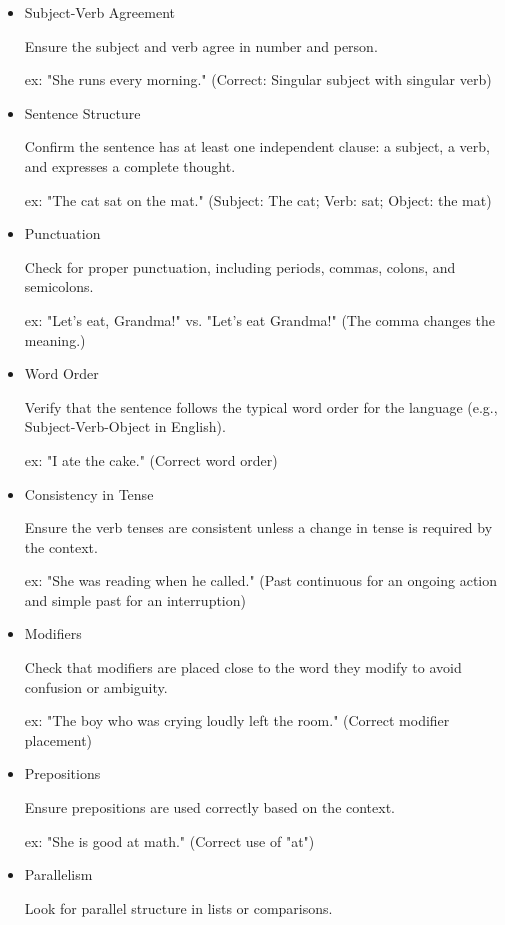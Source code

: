 \documentclass{book}
\begin{document}
\begin{itemize}
	\item Subject-Verb Agreement
	      
	      Ensure the subject and verb agree in number and person.
	      
	      ex: "She runs every morning." (Correct: Singular subject with singular verb)
	\item Sentence Structure
	      
	      Confirm the sentence has at least one independent clause: a subject, a verb, and expresses a complete thought.
	      
	      ex: "The cat sat on the mat." (Subject: The cat; Verb: sat; Object: the mat)
	\item Punctuation
	      
	      Check for proper punctuation, including periods, commas, colons, and semicolons.
	      
	      ex: "Let's eat, Grandma!" vs. "Let's eat Grandma!" (The comma changes the meaning.)
	\item Word Order
	      
	      Verify that the sentence follows the typical word order for the language (e.g., Subject-Verb-Object in English).
	      
	      ex: "I ate the cake." (Correct word order)
	\item Consistency in Tense
	      
	      Ensure the verb tenses are consistent unless a change in tense is required by the context.
	      
	      ex: "She was reading when he called." (Past continuous for an ongoing action and simple past for an interruption)
	\item Modifiers
	      
	      Check that modifiers are placed close to the word they modify to avoid confusion or ambiguity.
	      
	      ex: "The boy who was crying loudly left the room." (Correct modifier placement)
	\item Prepositions
	      
	      Ensure prepositions are used correctly based on the context.
	      
	      ex: "She is good at math." (Correct use of "at")
	\item Parallelism
	      
	      Look for parallel structure in lists or comparisons.
	      

\end{itemize}
\end{document}
